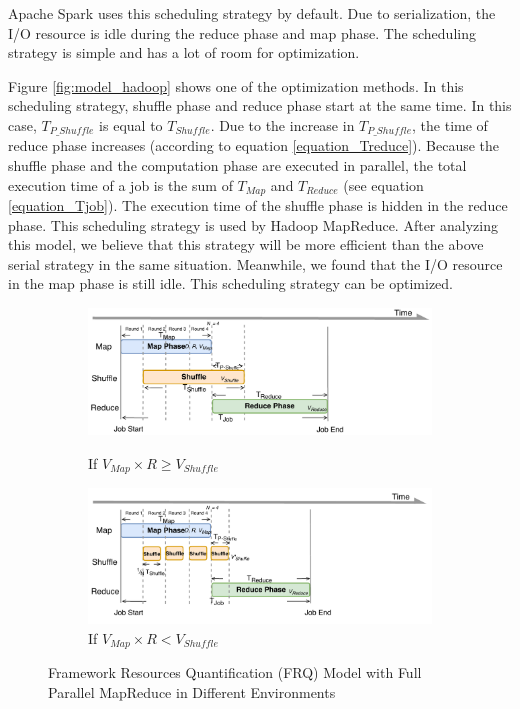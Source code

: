 {Apache Spark uses this scheduling strategy by default. Due to serialization, the I/O resource is idle during the reduce phase and map phase. The scheduling strategy is simple and has a lot of room for optimization.

Figure \ref{fig:model_hadoop} shows one of the optimization methods. In this scheduling strategy, shuffle phase and reduce phase start at the same time. In this case, \(T_{P\_Shuffle}\) is equal to \(T_{Shuffle}\). Due to the increase in \(T_{P\_Shuffle}\), the time of reduce phase increases (according to equation \ref{equation_Treduce}). Because the shuffle phase and the computation phase are executed in parallel, the total execution time of a job is the sum of \(T_{Map}\) and \(T_{Reduce}\) (see equation \ref{equation_Tjob}). The execution time of the shuffle phase is hidden in the reduce phase. This scheduling strategy is used by Hadoop MapReduce. After analyzing this model, we believe that this strategy will be more efficient than the above serial strategy in the same situation. Meanwhile, we found that the I/O resource in the map phase is still idle. This scheduling strategy can be optimized.

\begin{figure}
	\centering
	\begin{minipage}[hb]{\linewidth}
		\begin{subfigure}{\linewidth}
			\begin{minipage}{\linewidth}
				\includegraphics[width=\linewidth]{fig/model_scache1}
				\caption{\color{blue}If \(V_{Map} \times R \ge V_{Shuffle}\)}
				\label{fig:model_scache1}
			\end{minipage}
			\begin{minipage}{\linewidth}
				\includegraphics[width=\linewidth]{fig/model_scache2}
				\caption{\color{blue}If \(V_{Map} \times R < V_{Shuffle}\)}
				\label{fig:model_scache2}
			\end{minipage}
		\end{subfigure}
		\caption{\color{blue}Framework Resources Quantification (FRQ) Model with Full Parallel MapReduce in Different Environments}
		\label{fig:model_scache}
	\end{minipage}
\end{figure}

}

